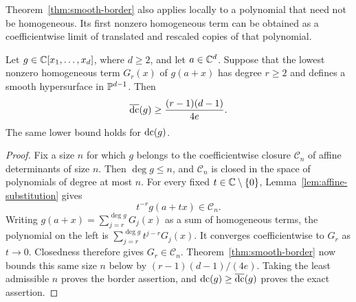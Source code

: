Theorem~\ref{thm:smooth-border} also applies locally to a polynomial that
need not be homogeneous. Its first nonzero homogeneous term can be obtained
as a coefficientwise limit of translated and rescaled copies of that polynomial.

\begin{corollary}
\label{cor:smooth-initial-form}
Let $g\in\mathbb C[x_1,\ldots,x_d]$, where $d\ge2$, and let $a\in\mathbb C^d$.
Suppose that the lowest nonzero homogeneous term $G_r(x)$ of $g(a+x)$
has degree $r\ge2$ and defines a smooth hypersurface in $\mathbb P^{d-1}$.
Then
\[
 \operatorname{\overline{dc}}(g)\ge\frac{(r-1)(d-1)}{4e}.
\]
The same lower bound holds for $\operatorname{dc}(g)$.
\end{corollary}
\begin{proof}
Fix a size $n$ for which $g$ belongs to the coefficientwise closure
$\mathcal C_n$ of affine determinants of size $n$. Then $\deg g\le n$,
and $\mathcal C_n$ is closed in the space of polynomials of degree at
most $n$. For every fixed $t\in\mathbb C\setminus\{0\}$,
Lemma~\ref{lem:affine-substitution} gives
\[
 t^{-r}g(a+tx)\in\mathcal C_n.
\]
Writing $g(a+x)=\sum_{j=r}^{\deg g}G_j(x)$ as a sum of homogeneous
terms, the polynomial on the left is
$\sum_{j=r}^{\deg g}t^{j-r}G_j(x)$. It converges coefficientwise to
$G_r$ as $t\to0$. Closedness therefore gives $G_r\in\mathcal C_n$.
Theorem~\ref{thm:smooth-border} now bounds this same size $n$ below by
$(r-1)(d-1)/(4e)$. Taking the least admissible $n$ proves the border
assertion, and $\operatorname{dc}(g)\ge\operatorname{\overline{dc}}(g)$ proves the exact assertion.
\end{proof}
